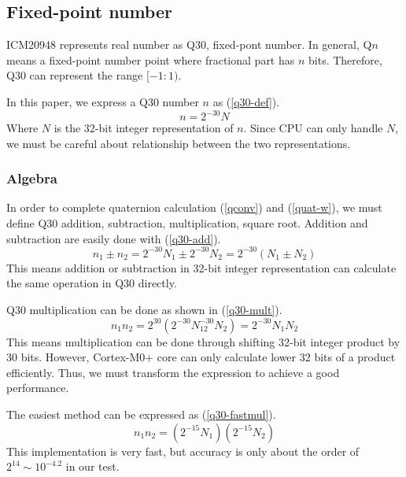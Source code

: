 \documentclass[journal]{IEEEtran}
\begin{document}
\subsection{Fixed-point number}
ICM20948 represents real number as Q30, fixed-pont number.
In general, Q\(n\) means a fixed-point number point where fractional part has \(n\) bits.
Therefore, Q30 can represent the range \([-1:1)\).

In this paper, we express a Q30 number \(n\) as (\ref{q30-def}).
\begin{equation}
    n = 2^{-30}N \label{q30-def}
\end{equation}
Where \(N\) is the 32-bit integer representation of \(n\).
Since CPU can only handle \(N\), we must be careful about relationship between the two representations.

\subsubsection{Algebra}
In order to complete quaternion calculation (\ref{qconv}) and (\ref{quat-w}), we must define Q30 addition, subtraction, multiplication, square root.
Addition and subtraction are easily done with (\ref{q30-add}).
\begin{equation}
    n_1 \pm n_2 = 2^{-30}N_1 \pm 2^{-30}N_2 = 2^{-30}(N_1 \pm N_2) \label{q30-add}
\end{equation}
This means addition or subtraction in 32-bit integer representation can calculate the same operation in Q30 directly.

Q30 multiplication can be done as shown in (\ref{q30-mult}).
\begin{equation}
    n_1 n_2 = 2^{30}(2^{-30}N_12^{-30}N_2) = 2^{-30}N_1N_2 \label{q30-mult}
\end{equation}
This means multiplication can be done through shifting 32-bit integer product by 30 bits.
However, Cortex-M0+ core can only calculate lower 32 bits of a product efficiently.
Thus, we must transform the expression to achieve a good performance.

The easiest method can be expressed as (\ref{q30-fastmul}).
\begin{equation}
    n_1n_2 = \left(2^{-15}N_1\right)\left(2^{-15}N_2\right) \label{q30-fastmul}
\end{equation}
This implementation is very fast, but accuracy is only about the order of \(2^{14} \sim 10^{-4.2}\) in our test.
\end{document}
